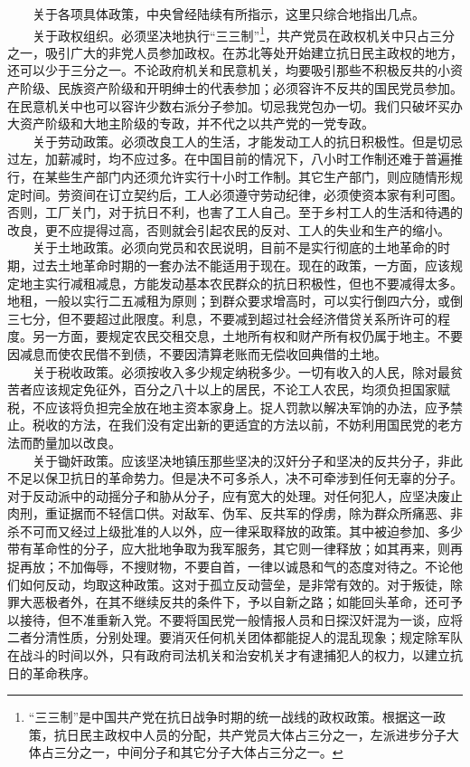 \documentclass[cn,11pt,chinese]{elegantbook}
\begin{document}
　　关于各项具体政策，中央曾经陆续有所指示，这里只综合地指出几点。\\
　　关于政权组织。必须坚决地执行“三三制”\footnote[7]{ “三三制”是中国共产党在抗日战争时期的统一战线的政权政策。根据这一政策，抗日民主政权中人员的分配，共产党员大体占三分之一，左派进步分子大体占三分之一，中间分子和其它分子大体占三分之一。}，共产党员在政权机关中只占三分之一，吸引广大的非党人员参加政权。在苏北等处开始建立抗日民主政权的地方，还可以少于三分之一。不论政府机关和民意机关，均要吸引那些不积极反共的小资产阶级、民族资产阶级和开明绅士的代表参加；必须容许不反共的国民党员参加。在民意机关中也可以容许少数右派分子参加。切忌我党包办一切。我们只破坏买办大资产阶级和大地主阶级的专政，并不代之以共产党的一党专政。\\
　　关于劳动政策。必须改良工人的生活，才能发动工人的抗日积极性。但是切忌过左，加薪减时，均不应过多。在中国目前的情况下，八小时工作制还难于普遍推行，在某些生产部门内还须允许实行十小时工作制。其它生产部门，则应随情形规定时间。劳资间在订立契约后，工人必须遵守劳动纪律，必须使资本家有利可图。否则，工厂关门，对于抗日不利，也害了工人自己。至于乡村工人的生活和待遇的改良，更不应提得过高，否则就会引起农民的反对、工人的失业和生产的缩小。\\
　　关于土地政策。必须向党员和农民说明，目前不是实行彻底的土地革命的时期，过去土地革命时期的一套办法不能适用于现在。现在的政策，一方面，应该规定地主实行减租减息，方能发动基本农民群众的抗日积极性，但也不要减得太多。地租，一般以实行二五减租为原则；到群众要求增高时，可以实行倒四六分，或倒三七分，但不要超过此限度。利息，不要减到超过社会经济借贷关系所许可的程度。另一方面，要规定农民交租交息，土地所有权和财产所有权仍属于地主。不要因减息而使农民借不到债，不要因清算老账而无偿收回典借的土地。\\
　　关于税收政策。必须按收入多少规定纳税多少。一切有收入的人民，除对最贫苦者应该规定免征外，百分之八十以上的居民，不论工人农民，均须负担国家赋税，不应该将负担完全放在地主资本家身上。捉人罚款以解决军饷的办法，应予禁止。税收的方法，在我们没有定出新的更适宜的方法以前，不妨利用国民党的老方法而酌量加以改良。\\
　　关于锄奸政策。应该坚决地镇压那些坚决的汉奸分子和坚决的反共分子，非此不足以保卫抗日的革命势力。但是决不可多杀人，决不可牵涉到任何无辜的分子。对于反动派中的动摇分子和胁从分子，应有宽大的处理。对任何犯人，应坚决废止肉刑，重证据而不轻信口供。对敌军、伪军、反共军的俘虏，除为群众所痛恶、非杀不可而又经过上级批准的人以外，应一律采取释放的政策。其中被迫参加、多少带有革命性的分子，应大批地争取为我军服务，其它则一律释放；如其再来，则再捉再放；不加侮辱，不搜财物，不要自首，一律以诚恳和气的态度对待之。不论他们如何反动，均取这种政策。这对于孤立反动营垒，是非常有效的。对于叛徒，除罪大恶极者外，在其不继续反共的条件下，予以自新之路；如能回头革命，还可予以接待，但不准重新入党。不要将国民党一般情报人员和日探汉奸混为一谈，应将二者分清性质，分别处理。要消灭任何机关团体都能捉人的混乱现象；规定除军队在战斗的时间以外，只有政府司法机关和治安机关才有逮捕犯人的权力，以建立抗日的革命秩序。\\
\end{document}
